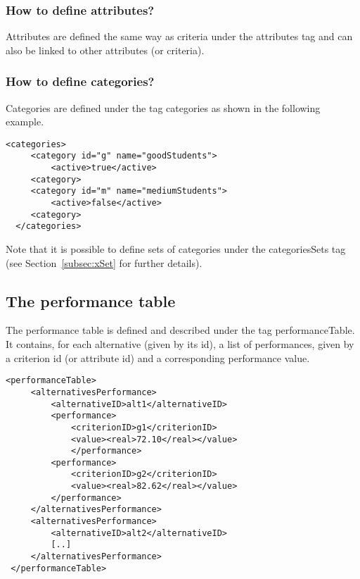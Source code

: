 \documentclass[a4paper,oneside,10 pt]{article}
\newcommand{\code}{\asciifamily}
\begin{document}
\subsubsection{How to define attributes?}

Attributes are defined the same way as criteria under the {\code attributes} tag and can also be linked to other attributes (or criteria). 

\subsubsection{How to define categories?}

Categories are defined under the tag {\code categories} as shown in the following example. 
{\code
\begin{lstlisting}[style=prototype]
 <categories>
	 <category id="g" name="goodStudents">
		 <active>true</active>
	 <category>
	 <category id="m" name="mediumStudents">
		 <active>false</active>
	 <category>
  </categories>
\end{lstlisting}
}

Note that it is possible to define sets of categories under the {\code categoriesSets} tag (see Section~\ref{subsec:xSet} for further details).




\subsection{The performance table}

The performance table is defined and described under the tag {\code performanceTable}. It contains, for each alternative (given by its id), a list of performances, given by a criterion id (or attribute id) and a corresponding performance value. 

{\code
\begin{lstlisting}[style=prototype]
 <performanceTable>
	 <alternativesPerformance>
		 <alternativeID>alt1</alternativeID>
		 <performance>
			 <criterionID>g1</criterionID>
			 <value><real>72.10</real></value>
			 </performance>
		 <performance>
			 <criterionID>g2</criterionID>
			 <value><real>82.62</real></value>
		 </performance>
	 </alternativesPerformance>
	 <alternativesPerformance>
		 <alternativeID>alt2</alternativeID>
		 [..]
	 </alternativesPerformance>
 </performanceTable>
\end{lstlisting}
}

\end{document}
